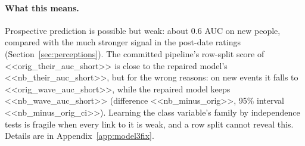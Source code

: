 \paragraph{What this means.} Prospective prediction is possible but weak: about 0.6 AUC on new
people, compared with the much stronger signal in the post-date ratings
(Section~\ref{sec:perceptions}). The committed pipeline's row-split score of
<<orig_their_auc_short>> is close to the repaired model's <<nb_their_auc_short>>, but for the wrong
reasons: on new events it falls to <<orig_wave_auc_short>>, while the repaired model keeps
<<nb_wave_auc_short>> (difference <<nb_minus_orig>>, 95\% interval <<nb_minus_orig_ci>>). Learning
the class variable's family by independence tests is fragile when every link to it is weak, and a
row split cannot reveal this. Details are in Appendix~\ref{app:model3fix}.
